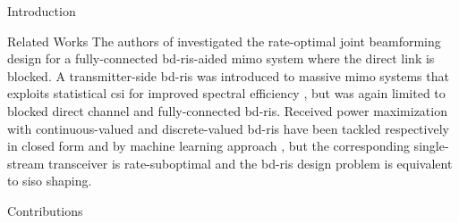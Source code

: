 \documentclass[journal]{IEEEtran}
\begin{document}
\begin{section}{Introduction}
\begin{subsection}{Related Works}
		The authors of \cite{Bartoli2023} investigated the rate-optimal joint beamforming design for a fully-connected \gls{bd}-\gls{ris}-aided \gls{mimo} system where the direct link is blocked.
		A transmitter-side \gls{bd}-\gls{ris} was introduced to
		massive \gls{mimo} systems that exploits statistical \gls{csi} for improved spectral efficiency \cite{Mishra2024}, but was again limited to blocked direct channel and fully-connected \gls{bd}-\gls{ris}.
		Received power maximization with continuous-valued and discrete-valued \gls{bd}-\gls{ris} have been tackled respectively in closed form \cite{Nerini2023} and by machine learning approach \cite{Nerini2023b}, but the corresponding single-stream transceiver is rate-suboptimal and the \gls{bd}-\gls{ris} design problem is equivalent to \gls{siso} shaping.


	\end{subsection}

	\begin{subsection}{Contributions}


\end{subsection}
\end{section}
\end{document}

